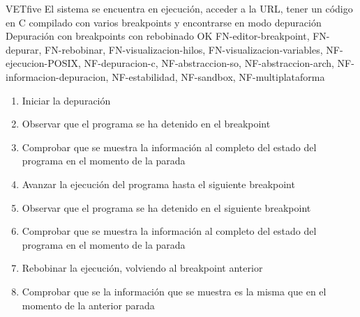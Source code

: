     \begin{testCase}{VET}{five}
        {El sistema se encuentra en ejecución, acceder a la URL, tener un código en C compilado con varios breakpoints y encontrarse en modo depuración}
        {\NA}
        {Depuración con breakpoints con rebobinado}
        {OK}
        {FN-editor-breakpoint, FN-depurar, FN-rebobinar, FN-visualizacion-hilos, FN-visualizacion-variables, NF-ejecucion-POSIX, NF-depuracion-c, NF-abstraccion-so, NF-abstraccion-arch, NF-informacion-depuracion, NF-estabilidad, NF-sandbox, NF-multiplataforma}
        \begin{enumerate}
            \item Iniciar la depuración
            \item Observar que el programa se ha detenido en el breakpoint
            \item Comprobar que se muestra la información al completo del estado del programa en el momento de la parada
            \item Avanzar la ejecución del programa hasta el siguiente breakpoint
            \item Observar que el programa se ha detenido en el siguiente breakpoint
            \item Comprobar que se muestra la información al completo del estado del programa en el momento de la parada
            \item Rebobinar la ejecución, volviendo al breakpoint anterior
            \item Comprobar que se la información que se muestra es la misma que en el momento de la anterior parada
        \end{enumerate}
    \end{testCase}

